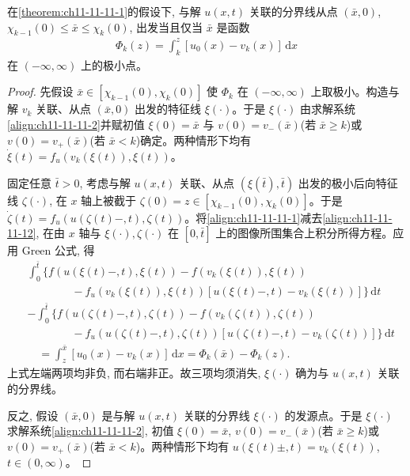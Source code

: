 \documentclass[../../main.tex]{subfiles}
\begin{document}
\begin{theorem}\label{theorem:ch11-11-11-2}
在\cref{theorem:ch11-11-11-1}的假设下, 与解 $u(x,t)$ 关联的分界线从点 $(\bar x,0)$, $\chi_{k-1}(0)\leqslant\bar x\leqslant\chi_k(0)$, 出发当且仅当 $\bar x$ 是函数
\begin{align}
\Phi_k(z)=\int_k^z[u_0(x)-v_k(x)]\,\mathrm{d}x\label{align:ch11-11-11-13}
\end{align}
在 $(-\infty,\infty)$ 上的极小点。
\end{theorem}

\begin{proof}
先假设 $\bar x\in[\chi_{k-1}(0),\chi_k(0)]$ 使 $\Phi_k$ 在 $(-\infty,\infty)$ 上取极小。构造与解 $v_k$ 关联、从点 $(\bar x,0)$ 出发的特征线 $\xi(\cdot)$。于是 $\xi(\cdot)$ 由求解系统\eqref{align:ch11-11-11-2}并赋初值 $\xi(0)=\bar x$ 与 $v(0)=v_-(\bar x)$(若 $\bar x\geqslant k$)或 $v(0)=v_+(\bar x)$(若 $\bar x<k$)确定。两种情形下均有 $\dot{\xi}(t)=f_u(v_k(\xi(t)),\xi(t))$。

固定任意 $\bar t>0$, 考虑与解 $u(x,t)$ 关联、从点 $(\xi(\bar t),\bar t)$ 出发的极小后向特征线 $\zeta(\cdot)$, 在 $x$ 轴上被截于 $\zeta(0)=z\in[\chi_{k-1}(0),\chi_k(0)]$。于是 $\dot{\zeta}(t)=f_u(u(\zeta(t)-,t),\zeta(t))$。将\eqref{align:ch11-11-11-1}减去\eqref{align:ch11-11-11-12}, 在由 $x$ 轴与 $\xi(\cdot),\zeta(\cdot)$ 在 $[0,\bar t]$ 上的图像所围集合上积分所得方程。应用 Green 公式, 得
\begin{align}
&\int_0^{\bar t}\bigl\{f(u(\xi(t)-,t),\xi(t))-f(v_k(\xi(t)),\xi(t))\nonumber\\
&\qquad\qquad-f_u(v_k(\xi(t)),\xi(t))[u(\xi(t)-,t)-v_k(\xi(t))]\bigr\}\,\mathrm{d}t\nonumber\\
&-\int_0^{\bar t}\bigl\{f(u(\zeta(t)-,t),\zeta(t))-f(v_k(\zeta(t)),\zeta(t))\nonumber\\
&\qquad\qquad-f_u(u(\zeta(t)-,t),\zeta(t))[u(\zeta(t)-,t)-v_k(\zeta(t))]\bigr\}\,\mathrm{d}t\nonumber\\
&\quad=\int_z^{\bar x}[u_0(x)-v_k(x)]\,\mathrm{d}x=\Phi_k(\bar x)-\Phi_k(z).\label{align:ch11-11-11-14}
\end{align}
上式左端两项均非负, 而右端非正。故三项均须消失, $\xi(\cdot)$ 确为与 $u(x,t)$ 关联的分界线。

反之, 假设 $(\bar x,0)$ 是与解 $u(x,t)$ 关联的分界线 $\xi(\cdot)$ 的发源点。于是 $\xi(\cdot)$ 求解系统\eqref{align:ch11-11-11-2}, 初值 $\xi(0)=\bar x$, $v(0)=v_-(\bar x)$(若 $\bar x\geqslant k$)或 $v(0)=v_+(\bar x)$(若 $\bar x<k$)。两种情形下均有 $u(\xi(t)\pm,t)=v_k(\xi(t))$, $t\in(0,\infty)$。


\end{proof}
\end{document}

